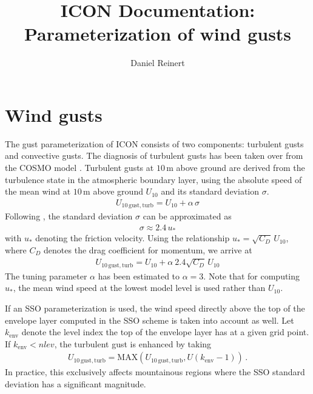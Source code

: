 \documentclass[a4paper,11pt]{article}
\author{Daniel Reinert}
\title{ICON Documentation: Parameterization of wind gusts}
\begin{document}
  \maketitle



\section{Wind gusts}

The gust parameterization of ICON consists of two components: turbulent gusts and convective gusts. The diagnosis of turbulent gusts has been taken over from the COSMO 
model \citep{Schulz:2003,Schulz:2008}. Turbulent gusts at $10\,\mathrm{m}$ above ground are derived from the turbulence state in the atmospheric boundary layer, using the absolute speed 
of the mean wind at $10\,\mathrm{m}$ above ground $U_{10}$ and its standard deviation $\sigma$.
\begin{align}
 U_{10\,\mathrm{gust, turb}} = U_{10} + \alpha\, \sigma
\end{align}
Following \cite{Panofsky:1984}, the standard deviation $\sigma$ can be approximated as
\begin{align*}
 \sigma \approx 2.4\,u_{\ast}
\end{align*}
with $u_{\ast}$ denoting the friction velocity. Using the relationship $u_{\ast}=\sqrt{C_{D}}\,U_{10}$, where $C_{D}$ denotes the drag coefficient for momentum, we 
arrive at
\begin{align}
 U_{10\,\mathrm{gust, turb}} = U_{10} + \alpha\ 2.4 \sqrt{C_{D}}\,U_{10} \label{eq_turb_gust}
\end{align}
The tuning parameter $\alpha$ has been estimated to $\alpha=3$. Note that for computing $u_{\ast}$, the mean wind speed at the lowest model level is used rather 
than $U_{10}$.

If an SSO parameterization is used, the wind speed directly above the top of the envelope layer computed in the SSO
scheme is taken into account as well. Let $k_\mathrm{env}$ denote the level index the top of the envelope layer has at a given
grid point. If $k_\mathrm{env} < nlev$, the turbulent gust is enhanced by taking
\begin{align}
 U_{10\,\mathrm{gust, turb}} = \mathrm{MAX}( U_{10\,\mathrm{gust, turb}}, U(k_\mathrm{env} -1)) \,.
\end{align}
In practice, this exclusively affects mountainous regions where the SSO standard deviation has a significant magnitude.
\end{document}
